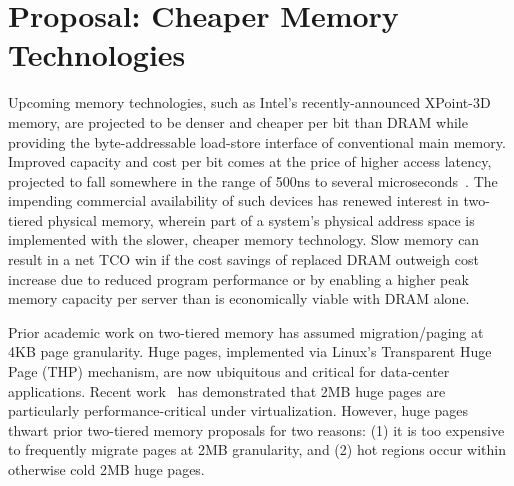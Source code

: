 \section{Proposal: Cheaper Memory Technologies}
Upcoming memory technologies, such as Intel's recently-announced XPoint-3D
memory, are projected to be denser and cheaper per bit than DRAM while providing
the byte-addressable load-store interface of conventional main memory.  Improved
capacity and cost per bit comes at the price of higher access latency, projected
to fall somewhere in the range of 500ns to several microseconds~\cite{xpoint}.
The impending commercial availability of such devices has renewed interest in
two-tiered physical memory, wherein part of a system's physical address space is
implemented with the slower, cheaper memory technology.  Slow memory can result
in a net TCO win if the cost savings of replaced DRAM outweigh cost increase due
to reduced program performance or by enabling a higher peak memory capacity per
server than is economically viable with DRAM alone.  



Prior academic work on two-tiered memory has assumed migration/paging at 4KB
page granularity.  Huge pages, implemented via Linux's Transparent Huge Page
(THP) mechanism, are now ubiquitous and critical for data-center applications.
Recent work~\cite{JeffPaper} has demonstrated that 2MB huge pages are particularly
performance-critical under virtualization.  
However, huge pages thwart prior two-tiered memory proposals for two reasons:
(1) it is too expensive to frequently migrate pages at 2MB granularity, and (2)
hot regions occur within otherwise cold 2MB huge pages. 

